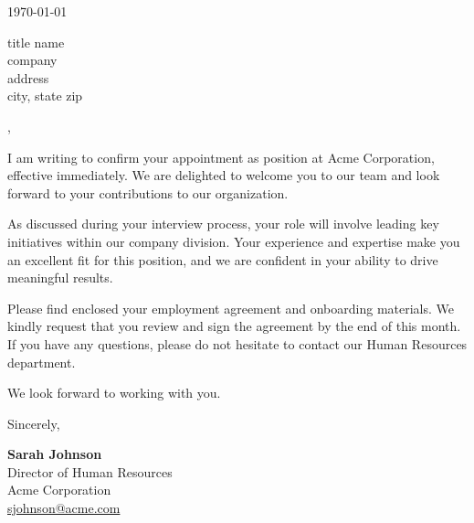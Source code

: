 \documentclass[11pt,a4paper]{article}
\begin{document}
\vspace*{1.5cm}

\noindent\today

\vspace{1cm}

\noindent
{{title}} {{name}}\\
{{company}}\\
{{address}}\\
{{city}}, {{state}} {{zip}}

\vspace{1cm}

,

\vspace{0.5cm}

\noindent
I am writing to confirm your appointment as {{position}} at Acme Corporation,
effective immediately. We are delighted to welcome you to our team and look
forward to your contributions to our organization.

As discussed during your interview process, your role will involve leading
key initiatives within our {{company}} division. Your experience and expertise
make you an excellent fit for this position, and we are confident in your
ability to drive meaningful results.

Please find enclosed your employment agreement and onboarding materials.
We kindly request that you review and sign the agreement by the end of this
month. If you have any questions, please do not hesitate to contact our
Human Resources department.

We look forward to working with you.

\vspace{1cm}

\noindent
Sincerely,

\vspace{1cm}

\noindent
\textbf{Sarah Johnson}\\
Director of Human Resources\\
Acme Corporation\\
\href{mailto:sjohnson@acme.com}{sjohnson@acme.com}
\end{document}
